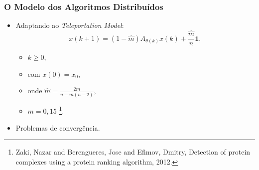 \documentclass{beamer}
\begin{document}
\begin{frame}
	\frametitle{O Modelo dos Algoritmos Distribuídos}

\begin{itemize}
\item Adaptando ao \textit{Teleportation Model}:
%
\begin{equation}
x(k+1) = (1 - \hat{m})A_{\theta(k)}x(k) + \frac{\hat{m}}{n}\textbf{1}, 
\end{equation}

	\begin{itemize}
	\item $k \geq 0,$ 
	\item com $x(0) = x_0,$
	\item onde $\hat{m} = \frac{2m}{n-m(n-2)},$
	\item $m = 0,15$ \footnote{\tiny \justifying Zaki, Nazar and Berengueres, Jose and Efimov, Dmitry, Detection of protein complexes using a protein ranking algorithm, 2012.}.
	\end{itemize}

\vspace{0.2cm}
\item Problemas de convergência.
\end{itemize}

\end{frame}
\end{document}
